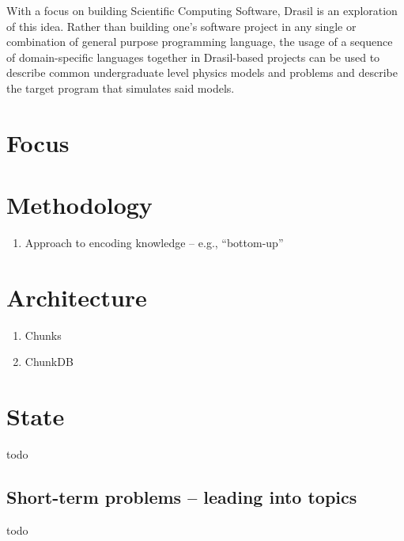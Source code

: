 With a focus on building Scientific Computing Software, Drasil is an
exploration of this idea. Rather than building one's software project in any
single or combination of general purpose programming language, the usage of a
sequence of domain-specific languages together in Drasil-based projects can be
used to describe common undergraduate level physics models and problems and
describe the target program that simulates said models.

\section{Focus}

\section{Methodology}

\begin{enumerate}
    \item Approach to encoding knowledge -- e.g., ``bottom-up''
\end{enumerate}

\section{Architecture}

\begin{enumerate}
    \item Chunks
    \item ChunkDB
\end{enumerate}

\section{State}
todo

\subsection{Short-term problems -- leading into topics}
todo
